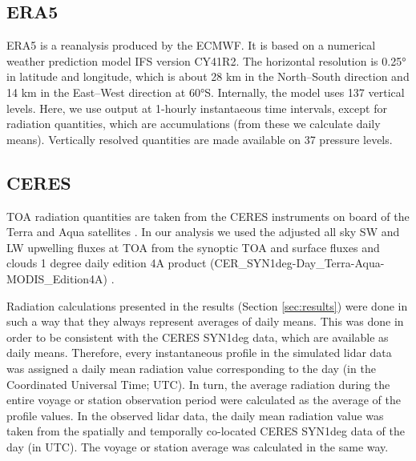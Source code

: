 \documentclass[12pt,a4paper]{article}
\begin{document}
\subsection{ERA5}

ERA5 \citep{era5} is a reanalysis produced by the ECMWF.  It is based on a
numerical weather prediction model IFS version CY41R2.  The horizontal
resolution is 0.25° in latitude and longitude, which is about 28 km in the
North--South direction and 14 km in the East--West direction at 60°S.
Internally, the model uses 137 vertical levels. Here, we use output at 1-hourly
instantaeous time intervals, except for radiation quantities, which are
accumulations (from these we calculate daily means).  Vertically resolved
quantities are made available on 37 pressure levels.

\subsection{CERES}

TOA radiation quantities are taken from the CERES instruments on board of the
Terra and Aqua satellites \citep{wielicki1996,loeb2018}. In our analysis we
used the adjusted all sky SW and LW upwelling fluxes at TOA from the synoptic
TOA and surface fluxes and clouds 1 degree daily edition 4A product
(CER\_SYN1deg-Day\_Terra-Aqua-MODIS\_Edition4A)
\citep{doelling2013,doelling2016}.

Radiation calculations presented in the results (Section \ref{sec:results})
were done in such a way that they always represent averages of daily means.
This was done in order to be consistent with the CERES SYN1deg data, which are
available as daily means. Therefore, every instantaneous profile in the
simulated lidar data was assigned a daily mean radiation value corresponding to
the day (in the Coordinated Universal Time; UTC). In turn, the average
radiation during the entire voyage or station observation period were
calculated as the average of the profile values. In the observed lidar data,
the daily mean radiation value was taken from the spatially and temporally
co-located CERES SYN1deg data of the day (in UTC). The voyage or station
average was calculated in the same way.
\end{document}
